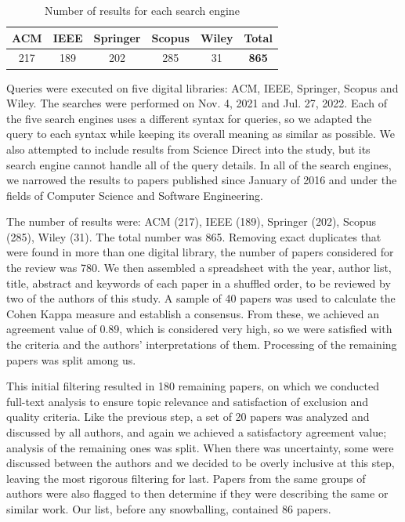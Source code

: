 \begin{table}[]
    \centering
    \begin{tabular}{cccccc}
        \toprule
        ACM & IEEE & Springer & Scopus & Wiley & \textbf{Total} \\
        \midrule
        217 & 189 & 202 & 285 & 31 & \textbf{865} \\
        \bottomrule
    \end{tabular}
    \caption{Number of results for each search engine}
    \label{tab:numberofresults}
\end{table}


Queries were executed on five digital libraries: ACM, IEEE, Springer, Scopus and Wiley.
The searches were performed on Nov. 4, 2021 and Jul. 27, 2022.
Each of the five search engines uses a different syntax for queries, so we adapted the query to each syntax while keeping its overall meaning as similar as possible.
We also attempted to include results from Science Direct into the study, but its search engine cannot handle all of the query details.
In all of the search engines, we narrowed the results to papers published since January of 2016 and under the fields of Computer Science and Software Engineering.

The number of results were: ACM (217), IEEE (189), Springer (202), Scopus (285), Wiley (31).
The total number was 865.
Removing exact duplicates that were found in more than one digital library, the number of papers considered for the review was 780.
We then assembled a spreadsheet with the year, author list, title, abstract and keywords of each paper in a shuffled order, to be reviewed by two of the authors of this study.
A sample of 40 papers was used to calculate the Cohen Kappa measure and establish a consensus.
From these, we achieved an agreement value of 0.89, which is considered very high, so we were satisfied with the criteria and the authors' interpretations of them.
Processing of the remaining papers was split among us.

This initial filtering resulted in 180 remaining papers, on which we conducted full-text analysis to ensure topic relevance and satisfaction of exclusion and quality criteria.
Like the previous step, a set of 20 papers was analyzed and discussed by all authors, and again we achieved a satisfactory agreement value; analysis of the remaining ones was split.
When there was uncertainty, some were discussed between the authors and we decided to be overly inclusive at this step, leaving the most rigorous filtering for last.
Papers from the same groups of authors were also flagged to then determine if they were describing the same or similar work.
Our list, before any snowballing, contained 86 papers.

